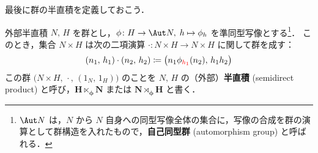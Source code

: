 \documentclass[geometry_main]{subfiles}
\begin{document}
最後に群の半直積を定義しておこう．


\begin{mydef}[label=def:semiprod-group-inner]{外部半直積}
	$N,\, H$ を群とし，$\phi \colon H \to \Aut N,\; h \mapsto \phi_h$ を準同型写像とする\footnote{$\Aut N$ は，$N$ から $N$ 自身への同型写像全体の集合に，写像の合成を群の演算として群構造を入れたもので，\textbf{自己同型群} (automorphism group) と呼ばれる．}．
	このとき，集合 $N \times H$ は次の二項演算 $\cdot \mathrel{} \colon N\times H \to N\times H$ に関して群を成す：
	\begin{align}
		(n_1,\, h_1) \cdot (n_2,\, h_2) \coloneqq \bigl( n_1 \phi_{\textcolor{red}{h_1}}(n_2),\, h_1h_2 \bigr) 
	\end{align}
	この群 $\bigl( N \times H,\, \cdot \mathrel{},\, (1_N,\, 1_H) \bigr)$ のことを $N,\, H$ の（外部）\textbf{半直積} (semidirect product) と呼び，$\bm{H \ltimes_\phi N}$ または $\bm{N \rtimes_\phi H}$ と書く．
\end{mydef}
\end{document}
